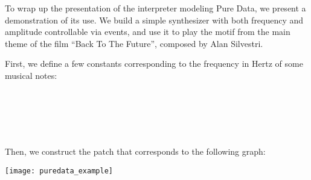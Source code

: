 
To wrap up the presentation of the interpreter modeling Pure Data, we present
a demonstration of its use. We build a simple synthesizer with both frequency
and amplitude controllable via events, and use it to play the motif from the
main theme of the film ``Back To The Future'', composed by Alan Silvestri.

First, we define a few constants corresponding to the frequency in Hertz of
some musical notes:

\begin{hscode}\SaveRestoreHook
{}%
%
%
\>[B]{}\<[9]%
\>[9]{}\mathrel{=}\<[E]%
\\
\>[B]{}\<[9]%
\>[9]{}\mathrel{=}\<[E]%
\\
\>[B]{}\<[9]%
\>[9]{}\mathrel{=}\<[E]%
\\
\>[B]{}\<[9]%
\>[9]{}\mathrel{=}\<[E]%
\\
\>[B]{}\<[9]%
\>[9]{}\mathrel{=}\<[E]%
\ColumnHook
\end{hscode}\resethooks

Then, we construct the patch that corresponds to the following graph:

\begin{center}
\texttt{[image: puredata\_example]}
\par\end{center}


